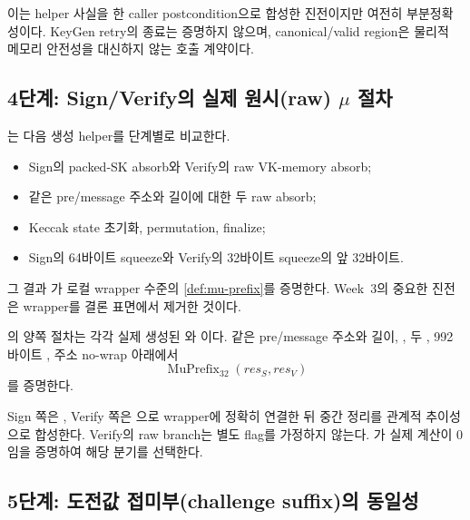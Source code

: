 이는 helper 사실을 한 caller postcondition으로 합성한 진전이지만 여전히
부분정확성이다. KeyGen retry의 종료는 증명하지 않으며, canonical/valid region은
물리적 메모리 안전성을 대신하지 않는 호출 계약이다.

\subsection{4단계: Sign/Verify의 실제 원시(raw) \texorpdfstring{\(\mu\)}{mu} 절차}

는 다음 생성
helper를 단계별로 비교한다.

\begin{itemize}
  \item Sign의 packed-SK absorb와 Verify의 raw VK-memory absorb;
  \item 같은 pre/message 주소와 길이에 대한 두 raw absorb;
  \item Keccak state 초기화, permutation, finalize;
  \item Sign의 64바이트 squeeze와 Verify의 32바이트 squeeze의 앞 32바이트.
\end{itemize}

그 결과 가 로컬 wrapper 수준의
\cref{def:mu-prefix}를 증명한다. Week~3의 중요한 진전은 wrapper를 결론 표면에서
제거한 것이다.

\begin{verified}
\label{thm:generated-mu}
의 양쪽 절차는 각각 실제 생성된
와
이다. 같은 pre/message 주소와 길이,
, 두 , 992바이트
, 주소 no-wrap 아래에서
\[
  \operatorname{MuPrefix}_{32}(res_S,res_V)
\]
를 증명한다.
\end{verified}

Sign 쪽은 , Verify 쪽은
으로 wrapper에 정확히 연결한 뒤
중간 정리를 관계적 추이성으로 합성한다. Verify의 raw branch는 별도 flag를
가정하지 않는다. 가 실제
 계산이 0임을 증명하여 해당 분기를 선택한다.

\subsection{5단계: 도전값 접미부(challenge suffix)의 동일성}

